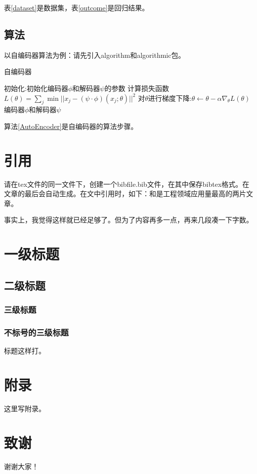 \documentclass[UTF8,a4paper,10.5pt]{ctexart}
\begin{document}
表\ref{dataset}是数据集，表\ref{outcome}是回归结果。

\subsection{算法}

以自编码器算法为例：请先引入algorithm和algorithmic包。

\begin{algorithm}[H]
	\renewcommand{\algorithmicensure}{\textbf{输出:}}
	\caption{自编码器}
	\label{AutoEncoder}
	\begin{algorithmic}[1]
		\STATE 初始化:初始化编码器$\phi$和解码器$\psi$的参数
		\STATE 计算损失函数$L(\theta)=\sum_j\min||x_j-(\psi\cdot\phi)(x_j;\theta)||^2$
		\STATE 对$\theta$进行梯度下降:$\theta\gets\theta-\alpha\nabla_\theta L(\theta)$
		\ENDFOR
		\ENDFOR
		\ENSURE  编码器$\phi$和解码器$\psi$
	\end{algorithmic}  
\end{algorithm}

算法\ref{AutoEncoder}是自编码器的算法步骤。

\section{引用}
请在tex文件的同一文件下，创建一个bibfile.bib文件，在其中保存bibtex格式。在文章的最后会自动生成。在文中引用时，如下：\cite{AlexNet}和\cite{ResNet}是工程领域应用量最高的两片文章。

事实上，我觉得这样就已经足够了。但为了内容再多一点，再来几段凑一下字数。

\section{一级标题}

\subsection{二级标题}

\subsubsection{三级标题}

\subsubsection*{不标号的三级标题}

标题这样打。


\section*{附录}
这里写附录。

\pagebreak
\clearpage
{}
{}




\pagebreak
\section*{致谢}

谢谢大家！
\end{document}
